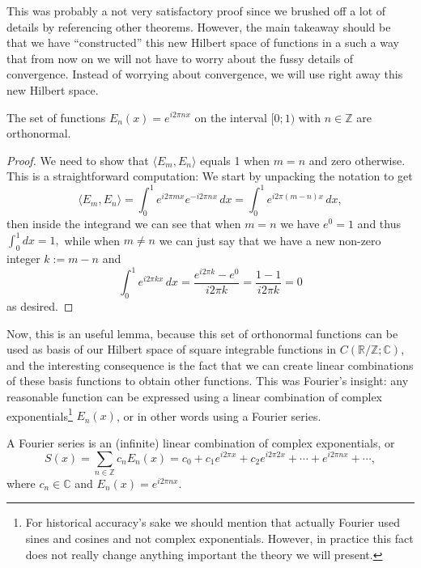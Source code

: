 This was probably a not very satisfactory proof since we brushed off a lot of
details by referencing other theorems. However, the main takeaway should be
that we have ``constructed'' this new Hilbert space of functions in a such a
way that from now on we will not have to worry about the fussy details of
convergence. Instead of worrying about convergence, we will use right away
this new Hilbert space.

\begin{lemma}
  \label{kugel:thm:exp-1d}
  The set of functions \(E_n(x) = e^{i2\pi nx}\) on the interval
  \([0; 1)\) with \(n \in \mathbb{Z} \) are orthonormal.
\end{lemma}
\begin{proof}
  We need to show that \(\langle E_m, E_n \rangle\) equals 1 when \(m = n\)
  and zero otherwise. This is a straightforward computation: We start by
  unpacking the notation to get
  \[
    \langle E_m, E_n \rangle
    = \int_0^1 e^{i2\pi mx} e^{- i2\pi nx} \, dx
    = \int_0^1 e^{i2\pi (m - n)x} \, dx,
  \]
  then inside the integrand we can see that when \(m = n\) we have \(e^0 = 1\) and
  thus \( \int_0^1 dx = 1, \) while when \(m \neq n\) we can just say that we
  have a new non-zero integer
  \(k := m - n\) and
  \[
    \int_0^1 e^{i2\pi kx} \, dx
    = \frac{e^{i2\pi k} - e^{0}}{i2\pi k}
    = \frac{1 - 1}{i2\pi k}
    = 0
  \]
  as desired. \qedhere
\end{proof}

Now, this is an useful lemma, because this set of orthonormal functions can be
used as basis of our Hilbert space of square integrable functions in
$C(\mathbb{R}/\mathbb{Z}; \mathbb{C})$, and the interesting consequence is the
fact that we can create linear combinations of these basis functions to obtain
other functions. This was Fourier's insight: any reasonable function can be
expressed using a linear combination of complex exponentials\footnote{For
historical accuracy's sake we should mention that actually Fourier used sines
and cosines and not complex exponentials. However, in practice this fact does
not really change anything important the theory we will present.} $E_n(x)$, or
in other words using a Fourier series.

\begin{definition}
  A Fourier series is an (infinite) linear combination of complex
  exponentials, or
  \begin{equation*}
    S(x) = \sum_{n \in \mathbb{Z}} c_n E_n(x)
      = c_0 + c_1 e^{i2\pi x} + c_2 e^{i2\pi 2x}
        + \cdots + e^{i2\pi nx} + \cdots,
  \end{equation*}
  where $c_n \in \mathbb{C}$ and $E_n(x) = e^{i2\pi nx}$.
\end{definition}

